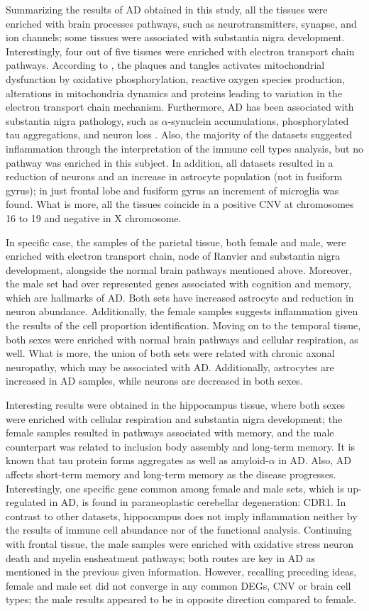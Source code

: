 Summarizing the results of AD obtained in this study, all the tissues were enriched with brain processes pathways, such as neurotransmitters, synapse, and ion channels; some tissues were associated with substantia nigra development. Interestingly, four out of five tissues were enriched with electron transport chain pathways. According to \cite{eckert}, the plaques and tangles activates mitochondrial dysfunction by oxidative phosphorylation, reactive oxygen species production, alterations in mitochondria dynamics and proteins leading to variation in the electron transport chain mechanism. Furthermore, AD has been associated with substantia nigra pathology, such as $\alpha$-synuclein accumulations, phosphorylated tau aggregations, and neuron loss \cite{burns}. Also, the majority of the datasets suggested inflammation through the interpretation of the immune cell types analysis, but no pathway was enriched in this subject. In addition, all datasets resulted in a reduction of neurons and an increase in astrocyte population (not in fusiform gyrus); in just frontal lobe and fusiform gyrus an increment of microglia was found. What is more, all the tissues coincide in a positive CNV
at chromosomes 16 to 19 and negative in X chromosome.

In specific case, the samples of the parietal tissue, both female and male, were enriched with electron transport chain, node of Ranvier and substantia nigra development, alongside the normal brain pathways mentioned above. Moreover, the male set had over represented genes associated with cognition and memory, which are hallmarks of AD. Both sets have increased astrocyte and reduction in neuron abundance. Additionally, the female samples suggests inflammation given the results of the cell proportion identification. Moving on to the temporal tissue, both sexes were enriched with normal brain pathways and cellular respiration, as well. What is more, the union of both sets were related with chronic axonal neuropathy, which may be associated with AD. Additionally, astrocytes are increased in AD samples, while neurons are decreased in both sexes.

Interesting results were obtained in the hippocampus tissue, where both sexes were enriched with cellular respiration and substantia nigra development; the female samples resulted in pathways associated with memory, and the male counterpart was related to inclusion body assembly and long-term memory. It is known that tau protein forms aggregates as well as amyloid-$\alpha$ in AD. Also, AD affects short-term memory and long-term memory as the disease progresses. Interestingly, one specific gene common among female and male sets, which is up-regulated in AD, is found in paraneoplastic cerebellar degeneration: CDR1. In contrast to other datasets, hippocampus does not imply inflammation neither by the results of immune cell abundance nor of the functional analysis. Continuing with frontal tissue, the male samples were enriched with oxidative stress neuron death and myelin ensheatment pathways; both routes are key in AD as mentioned in the previous given information. However, recalling preceding ideas, female and male set did not converge in any common DEGs, CNV or brain cell types; the male results appeared to be in opposite direction compared to female.

